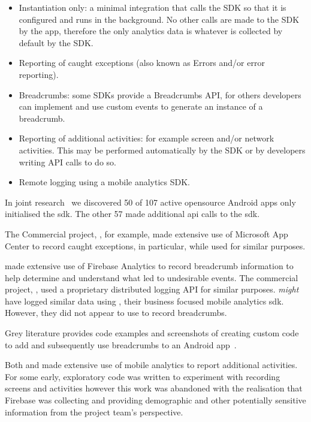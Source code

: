 \begin{itemize}
    \item Instantiation only: a minimal integration that calls the SDK so that it is configured and runs in the background. No other calls are made to the SDK by the app, therefore the only analytics data is whatever is collected by default by the SDK.
    \item Reporting of caught exceptions (also known as Errors and/or error reporting). 
    \item Breadcrumbs: some SDKs provide a Breadcrumbs API, for others developers can implement and use custom events to generate an instance of a breadcrumb.
    \item Reporting of additional activities: for example screen and/or network activities. This may be performed automatically by the SDK or by developers writing API calls to do so.
    \item Remote logging using a mobile analytics SDK.
\end{itemize}

In joint research~ we discovered 50 of 107 active opensource Android apps only initialised the  \Gls{sdk}. The other 57 made additional \Gls{api} calls to the \Gls{sdk}.

The Commercial project, , for example, made extensive use of Microsoft App Center to record caught exceptions, in particular, while  used  for similar purposes. 

 made extensive use of Firebase Analytics to record breadcrumb information to help determine and understand what led to undesirable events.  The commercial project, , used a proprietary distributed logging API for similar purposes.  \emph{might} have logged similar data using , their business focused mobile analytics \Gls{sdk}. However, they did not appear to use  to record breadcrumbs. 

Grey literature provides code examples and screenshots of creating custom code to add and subsequently use breadcrumbs to an Android app~. 

Both  and  made extensive use of mobile analytics to report additional activities. For  some early, exploratory code was written to experiment with recording screens and activities however this work was abandoned with the realisation that Firebase was collecting and providing demographic and other potentially sensitive information from the project team's perspective. 

